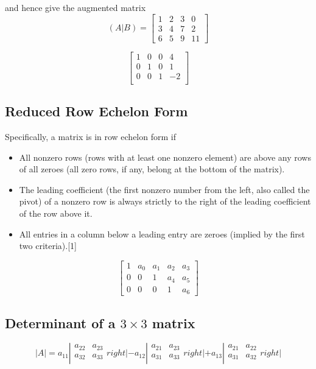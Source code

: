 \documentclass[12pt, a4paper]{article}
\begin{document}
and hence give the augmented matrix
\[
(A|B) =
  \left[\begin{array}{ccc|c}
1 & 2 & 3 & 0 \\
3 & 4 & 7 & 2 \\
6 & 5 & 9 & 11
  \end{array}\right]
\]

\[\left[\begin{array}{ccc|c}
1 & 0 & 0 & 4 \\
0 & 1 & 0 & 1 \\
0 & 0 & 1 & -2 \\
  \end{array}\right]\]

\subsection*{Reduced Row Echelon Form}

Specifically, a matrix is in row echelon form if
\begin{itemize}
\item All nonzero rows (rows with at least one nonzero element) are above any rows of all zeroes (all zero rows, if any, belong at the bottom of the matrix).
\item The leading coefficient (the first nonzero number from the left, also called the pivot) of a nonzero row is always strictly to the right of the leading coefficient of the row above it.
\item All entries in a column below a leading entry are zeroes (implied by the first two criteria).[1]
\end{itemize}
\[\left[ \begin{array}{ccccc}
1 & a_0 & a_1 & a_2 & a_3 \\
0 & 0 & 1 & a_4 & a_5 \\
0 & 0 & 0 & 1 & a_6
\end{array} \right]\]
\newpage
\subsection*{Determinant of a $3 \times 3$ matrix}
\[ |A| = a_{11} \left|\begin{array}{cc}
a_{22} & a_{23} \\
a_{32} & a_{33} \\
\end{array}  right| - a_{12} \left| \begin{array}{cc}
a_{21} & a_{23} \\
a_{31} & a_{33} \\
\end{array} right| + a_{13} \left|\begin{array}{cc}
a_{21} & a_{22} \\
a_{31} & a_{32} \\
\end{array}  right| \]
\newpage
\end{document}
